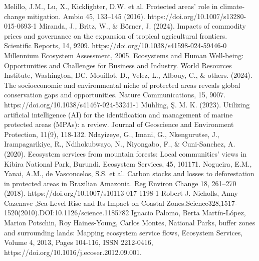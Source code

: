 \documentclass[12pt]{article}
\theoremstyle{break} %
\begin{document}
\newline \newline
Melillo, J.M., Lu, X., Kicklighter, D.W. et al. Protected areas’ role in climate-change mitigation. Ambio 45, 133–145 (2016). https://doi.org/10.1007/s13280-015-0693-1
\newline \newline
Miranda, J., Britz, W., \& Börner, J. (2024). Impacts of commodity prices and governance on the expansion of tropical agricultural frontiers. Scientific Reports, 14, 9209. https://doi.org/10.1038/s41598-024-59446-0
\newline \newline
Millennium Ecosystem Assessment, 2005. Ecosystems and Human Well-being: Opportunities and Challenges for Business and Industry. World Resources Institute, Washington, DC.
\newline \newline
Mouillot, D., Velez, L., Albouy, C., \& others. (2024). The socioeconomic and environmental niche of protected areas reveals global conservation gaps and opportunities. Nature Communications, 15, 9007. https://doi.org/10.1038/s41467-024-53241-1
\newline \newline
Mühling, Ş. M. K. (2023). Utilizing artificial intelligence (AI) for the identification and management of marine protected areas (MPAs): a review. Journal of Geoscience and Environment Protection, 11(9), 118-132.
\newline \newline
Ndayizeye, G., Imani, G., Nkengurutse, J., Irampagarikiye, R., Ndihokubwayo, N., Niyongabo, F., \& Cuni-Sanchez, A. (2020). Ecosystem services from mountain forests: Local communities’ views in Kibira National Park, Burundi. Ecosystem Services, 45, 101171.
\newline \newline
Nogueira, E.M., Yanai, A.M., de Vasconcelos, S.S. et al. Carbon stocks and losses to deforestation in protected areas in Brazilian Amazonia. Reg Environ Change 18, 261–270 (2018). https://doi.org/10.1007/s10113-017-1198-1
\newline \newline
Robert J. Nicholls, Anny Cazenave ,Sea-Level Rise and Its Impact on Coastal Zones.Science328,1517-1520(2010).DOI:10.1126/science.1185782
\newline \newline
Ignacio Palomo, Berta Martín-López, Marion Potschin, Roy Haines-Young, Carlos Montes, National Parks, buffer zones and surrounding lands: Mapping ecosystem service flows, Ecosystem Services, Volume 4, 2013, Pages 104-116, ISSN 2212-0416, https://doi.org/10.1016/j.ecoser.2012.09.001.
\end{document}
